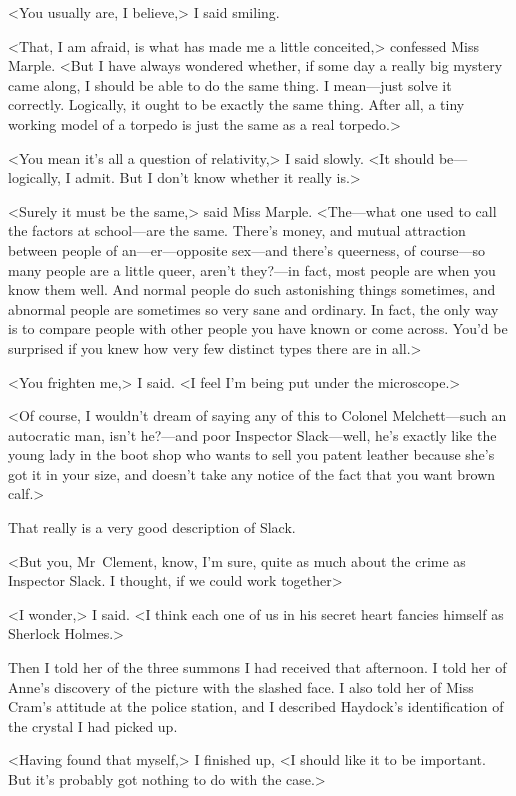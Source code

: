 <You usually are, I believe,> I said smiling.

<That, I am afraid, is what has made me a little conceited,> confessed Miss Marple. <But I have always wondered whether, if some day a really big mystery came along, I should be able to do the same thing. I mean—just solve it correctly. Logically, it ought to be exactly the same thing. After all, a tiny working model of a torpedo is just the same as a real torpedo.>

<You mean it's all a question of relativity,> I said slowly. <It should be—logically, I admit. But I don't know whether it really is.>

<Surely it must be the same,> said Miss Marple. <The—what one used to call the factors at school—are the same. There's money, and mutual attraction between people of an—er—opposite sex—and there's queerness, of course—so many people are a little queer, aren't they?—in fact, most people are when you know them well. And normal people do such astonishing things sometimes, and abnormal people are sometimes so very sane and ordinary. In fact, the only way is to compare people with other people you have known or come across. You'd be surprised if you knew how very few distinct types there are in all.>

<You frighten me,> I said. <I feel I'm being put under the microscope.>

<Of course, I wouldn't dream of saying any of this to Colonel Melchett—such an autocratic man, isn't he?—and poor Inspector Slack—well, he's exactly like the young lady in the boot shop who wants to sell you patent leather because she's got it in your size, and doesn't take any notice of the fact that you want brown calf.>

That really is a very good description of Slack.

<But you, Mr~Clement, know, I'm sure, quite as much about the crime as Inspector Slack. I thought, if we could work together\longdash>

<I wonder,> I said. <I think each one of us in his secret heart fancies himself as Sherlock Holmes.>

Then I told her of the three summons I had received that afternoon. I told her of Anne's discovery of the picture with the slashed face. I also told her of Miss Cram's attitude at the police station, and I described Haydock's identification of the crystal I had picked up.

<Having found that myself,> I finished up, <I should like it to be important. But it's probably got nothing to do with the case.>

